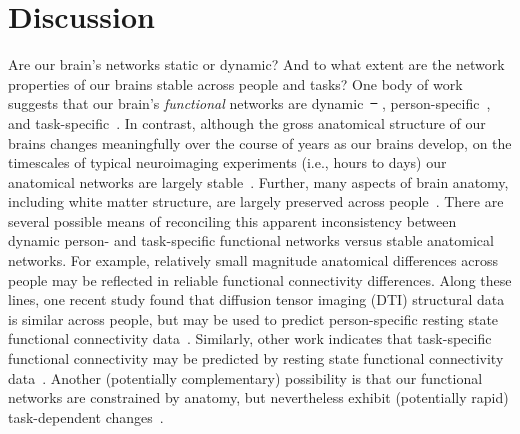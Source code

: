 \documentclass[10pt]{article}
\providecommand{\DIFaddtex}[1]{{\protect\color{blue}\uwave{#1}}} %
\providecommand{\DIFdeltex}[1]{{\protect\color{red}\sout{#1}}}                      %
\providecommand{\DIFaddbegin}{} %
\providecommand{\DIFaddend}{} %
\providecommand{\DIFdelbegin}{} %
\providecommand{\DIFdelend}{} %
\providecommand{\DIFadd}[1]{\texorpdfstring{\DIFaddtex{#1}}{#1}} %
\providecommand{\DIFdel}[1]{\texorpdfstring{\DIFdeltex{#1}}{}} %
\newcommand{\DIFscaledelfig}{0.5}
\newlength{\DIFdelgraphicswidth} %
\newlength{\DIFdelgraphicsheight} %
\newcommand{\DIFaddincludegraphics}[2][]{{\color{blue}\fbox{\DIFOincludegraphics[#1]{#2}}}} %
\newcommand{\DIFdelincludegraphics}[2][]{%
\sbox{\DIFdelgraphicsbox}{\DIFOincludegraphics[#1]{#2}}%
\settoboxwidth{\DIFdelgraphicswidth}{\DIFdelgraphicsbox} %
\settoboxtotalheight{\DIFdelgraphicsheight}{\DIFdelgraphicsbox} %
\scalebox{\DIFscaledelfig}{%
\parbox[b]{\DIFdelgraphicswidth}{\usebox{\DIFdelgraphicsbox}\\[-\baselineskip] \rule{\DIFdelgraphicswidth}{0em}}\llap{\resizebox{\DIFdelgraphicswidth}{\DIFdelgraphicsheight}{%
\setlength{\unitlength}{\DIFdelgraphicswidth}%
\begin{picture}(1,1)%
\thicklines\linethickness{2pt} %
{\color[rgb]{1,0,0}\put(0,0){\framebox(1,1){}}}%
{\color[rgb]{1,0,0}\put(0,0){\line( 1,1){1}}}%
{\color[rgb]{1,0,0}\put(0,1){\line(1,-1){1}}}%
\end{picture}%
}\hspace*{3pt}}} %
} %
\DeclareRobustCommand{\DIFaddbegin}{\DIFOaddbegin \let\includegraphics\DIFaddincludegraphics} %
\DeclareRobustCommand{\DIFaddend}{\DIFOaddend \let\includegraphics\DIFOincludegraphics} %
\DeclareRobustCommand{\DIFdelbegin}{\DIFOdelbegin \let\includegraphics\DIFdelincludegraphics} %
\DeclareRobustCommand{\DIFdelend}{\DIFOaddend \let\includegraphics\DIFOincludegraphics} %
\begin{document}
\DIFaddend \section*{Discussion}
Are our brain's networks static or dynamic?  And to what
extent are the network properties of our brains stable across people and tasks?
One body of work suggests that our brain's \textit{functional} networks are
dynamic~\DIFdelbegin \DIFdel{\mbox{%
\citep[e.g., ][]{MannEtal18}}\hspace{0pt}%
}\DIFdelend \DIFaddbegin \DIFadd{\mbox{%
\citep[e.g., ][]{MannEtal18, OwenEtal19}}\hspace{0pt}%
}\DIFaddend , person-specific~\citep[e.g.,
][]{FinnEtal15}, and task-specific~\citep[e.g., ][]{Turk13}.  In contrast,
although the gross anatomical structure of our brains changes meaningfully over
the course of years as our brains develop, on the timescales of typical
neuroimaging experiments (i.e., hours to days) our anatomical networks are
largely stable~\citep[e.g., ][]{CaseEtal00}.  Further, many aspects of brain
anatomy, including white matter structure, are largely preserved across
people~\citep[e.g., ][]{TalaTour88, JahaEtal13, MoriEtal08}. There are several
possible means of reconciling this apparent inconsistency between dynamic
person- and task-specific functional networks versus stable anatomical networks.
For example, relatively small magnitude anatomical differences across people may
be reflected in reliable functional connectivity differences.  Along these
lines, one recent study found that diffusion tensor imaging (DTI) structural
data is similar across people, but may be used to predict person-specific
resting state functional connectivity data~\citep{BeckEtal18}.  Similarly, other
work indicates that task-specific functional connectivity may be predicted by
resting state functional connectivity data~\citep{ColeEtal16, TavoEtal16}.
Another (potentially complementary) possibility is that our functional networks
are constrained by anatomy, but nevertheless exhibit (potentially rapid)
task-dependent changes~\citep[e.g., ][]{SporBetz16}.
\end{document}
